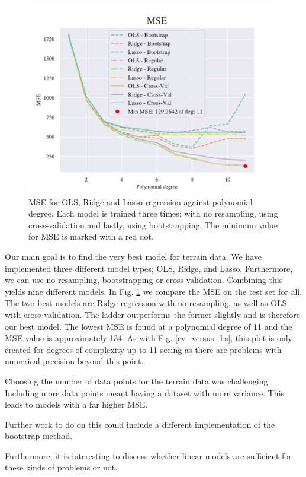 \begin{figure}[h!]
    \centering
    \includegraphics[width=1\linewidth]{project_1/figures/figures_in_report/All_terrain.pdf}
    \caption{MSE for OLS, Ridge and Lasso regression against polynomial degree. Each model is trained three times; with no resampling, using cross-validation and lastly, using bootstrapping. The minimum value for MSE is marked with a red dot.}
    \label{all_terrain}
\end{figure}

Our main goal is to find the very best model for terrain data. We have implemented three different model types; OLS, Ridge, and Lasso. Furthermore, we can use no resampling, bootstrapping or cross-validation. Combining this yields nine different models. In Fig. \ref{all_terrain} we compare the MSE on the test set for all. The two best models are Ridge regression with no resampling, as well as OLS with cross-validation. The ladder outperforms the former slightly and is therefore our best model. The lowest MSE is found at a polynomial degree of 11 and the MSE-value is approximately 134. As with Fig. \ref{cv_versus_bs}, this plot is only created for degrees of complexity up to 11 seeing as there are problems with numerical precision beyond this point. 


Choosing the number of data points for the terrain data was challenging. Including more data points meant having a dataset with more variance. This leads to models with a far higher MSE. 

Further work to do on this could include a different implementation of the bootstrap method.

Furthermore, it is interesting to discuss whether linear models are sufficient for these kinds of problems or not. 

